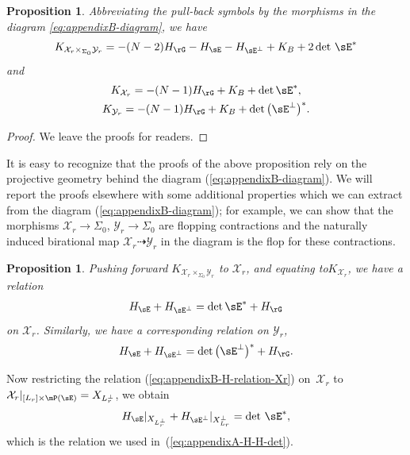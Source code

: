 \documentclass[pdftex]{sigma}
\numberwithin{equation}{section}
\newtheorem{Proposition}[Theorem]{Proposition}
\begin{document}
\begin{Proposition}\label{prop:appendixB-KKK} Abbreviating the pull-back symbols by the morphisms in the diagram \eqref{eq:appendixB-diagram}, we have
\begin{gather*}
K_{\mathcal{X}_{r}\times_{\Sigma_{0}}\mathcal{Y}_{r}}=-(N-2)H_{\rG}-H_{\sE}-H_{\sE^{\perp}}+K_{B}+2\det\,\sE^{*}
\end{gather*}
and
\begin{gather*}
 K_{\mathcal{X}_{r}}=-(N-1)H_{\rG}+K_{B}+\det \sE^{*},\\
 K_{\mathcal{Y}_{r}}=-(N-1)H_{\rG}+K_{B}+\det \big(\sE^{\perp}\big)^{*}.
\end{gather*}
\end{Proposition}
\begin{proof}We leave the proofs for readers.
\end{proof}

It is easy to recognize that the proofs of the above proposition rely on the projective geometry behind the diagram (\ref{eq:appendixB-diagram}). We will report the proofs elsewhere with some additional properties which we can extract from the diagram (\ref{eq:appendixB-diagram}); for example, we can show that the morphisms $\mathcal{X}_{r}\to\Sigma_{0}$, $\mathcal{Y}_{r}\to\Sigma_{0}$ are flopping contractions and the naturally induced birational map $\mathcal{X}_{r}\dashrightarrow\mathcal{Y}_{r}$ in the diagram is the flop for these contractions.
\begin{Proposition}\label{prop:appendixB-KKK2}Pushing forward $K_{\mathcal{X}_{r}\times_{\Sigma_{0}}\mathcal{Y}_{r}}$ to $\mathcal{X}_{r}$, and equating to$K_{\mathcal{X}_{r}}$, we have a relation
\begin{gather}
H_{\sE}+H_{\sE^{\perp}}=\det \sE^{*}+H_{\rG}\label{eq:appendixB-H-relation-Xr}
\end{gather}
on $\mathcal{X}_{r}$. Similarly, we have a corresponding relation on $\mathcal{Y}_{r}$,
\begin{gather*}
H_{\sE}+H_{\sE^{\perp}}=\det \big(\sE^{\perp}\big)^{*}+H_{\rG}.
\end{gather*}
\end{Proposition}

Now restricting the relation (\ref{eq:appendixB-H-relation-Xr}) on~$\mathcal{X}_{r}$ to $\mathcal{X}_{r}|_{[L_{r}]\times\mP(\sE)}=X_{L_{r}^{\perp}}$, we obtain
\begin{gather}
H_{\sE}|_{X_{L_{r}^{\perp}}}+H_{\sE^{\perp}}|_{X_{L_{r}}^{\perp}}=\det\,\sE^{*},\label{eq:appendixB-H-H-det}
\end{gather}
which is the relation we used in~(\ref{eq:appendixA-H-H-det}).
\end{document}
